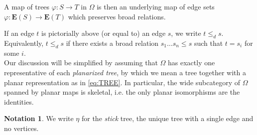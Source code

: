 \documentclass[a4paper,10pt
,draft
]{article}%
\numberwithin{equation}{section}
\numberwithin{figure}{section}
\theoremstyle{definition} %
\newtheorem{notation}[equation]{Notation}%
\newcommand{\1}{\ensuremath{\mathbbm 1}}%
\begin{document}
A map of trees $\varphi \colon S \to T$
in $\Omega$ is then an underlying map
of edge sets 
$\varphi \colon \boldsymbol{E}(S) \to \boldsymbol{E}(T)$
which preserves broad relations.

If an edge $t$ is pictorially above (or equal to) an edge $s$, we write $t \leq_d s$.
Equivalently, $t \leq_d s$ if there exists a broad relation $s_1\dots s_n \leq s$ such that $t = s_i$ for some $i$.\\

Our discussion will be simplified by assuming 
that $\Omega$ has exactly one representative of 
each \emph{planarized tree},
by which we mean a tree together with a planar representation as in \eqref{eq:TREE}.
In particular, the wide subcategory of $\Omega$ spanned by planar maps is skeletal,
i.e. the only planar isomorphisms are the identities.




\begin{notation}
	We write $\eta$ for the \textit{stick} tree, the unique tree with a single edge and no vertices.
\end{notation}
\end{document}
